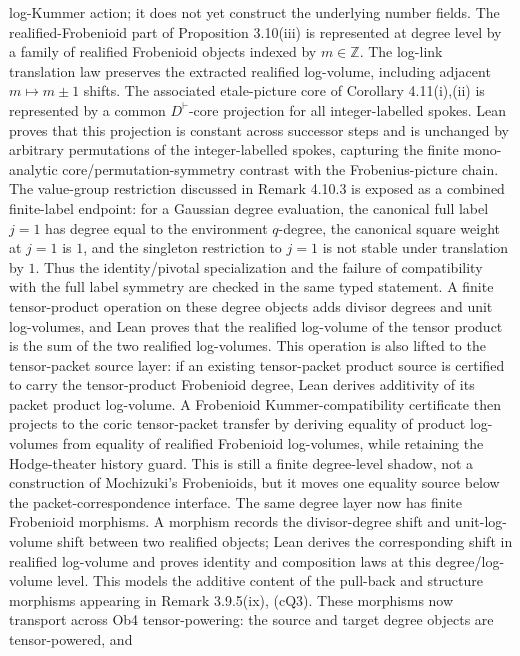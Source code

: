 \documentclass[11pt]{article}
\newcommand{\Lean}{Lean}
\theoremstyle{plain}
\theoremstyle{definition}
\theoremstyle{remark}
\begin{document}
log-Kummer action; it does not yet construct the underlying number fields.
The realified-Frobenioid part of Proposition 3.10(iii) is represented at
degree level by a family of realified Frobenioid objects indexed by
\(m\in\mathbb Z\).  The log-link translation law preserves the extracted
realified log-volume, including adjacent \(m\mapsto m\pm1\) shifts.
The associated etale-picture core of Corollary 4.11(i),(ii) is represented by
a common \(D^{\vdash}\)-core projection for all integer-labelled spokes.
\Lean{} proves that this projection is constant across successor steps and is
unchanged by arbitrary permutations of the integer-labelled spokes, capturing
the finite mono-analytic core/permutation-symmetry contrast with the
Frobenius-picture chain.
The value-group restriction discussed in Remark 4.10.3 is exposed as a
combined finite-label endpoint: for a Gaussian degree evaluation, the
canonical full label \(j=1\) has degree equal to the environment \(q\)-degree,
the canonical square weight at \(j=1\) is \(1\), and the singleton
restriction to \(j=1\) is not stable under translation by \(1\).  Thus the
identity/pivotal specialization and the failure of compatibility with the
full label symmetry are checked in the same typed statement.
A finite tensor-product operation on these degree objects adds divisor degrees
and unit log-volumes, and \Lean{} proves that the realified log-volume of the
tensor product is the sum of the two realified log-volumes.  This operation is
also lifted to the tensor-packet source layer: if an existing tensor-packet
product source is certified to carry the tensor-product Frobenioid degree,
\Lean{} derives additivity of its packet product log-volume.  A Frobenioid
Kummer-compatibility certificate then projects to the coric
tensor-packet transfer by deriving equality of product log-volumes from
equality of realified Frobenioid log-volumes, while retaining the
Hodge-theater history guard.  This is still a finite degree-level shadow, not
a construction of Mochizuki's Frobenioids, but it moves one equality source
below the packet-correspondence interface.
The same degree layer now has finite Frobenioid morphisms.  A morphism records
the divisor-degree shift and unit-log-volume shift between two realified
objects; \Lean{} derives the corresponding shift in realified log-volume and
proves identity and composition laws at this degree/log-volume level.  This
models the additive content of the pull-back and structure morphisms appearing
in Remark 3.9.5(ix), (cQ3).  These morphisms now transport across Ob4
tensor-powering: the source and target degree objects are tensor-powered, and
\end{document}
